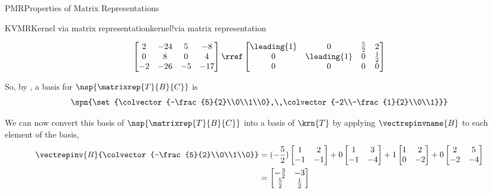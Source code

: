 \begin{subsect}{PMR}{Properties of Matrix Representations}
\begin{example}{KVMR}{Kernel via matrix representation}{kernel!via matrix representation}
\begin{para}
%
\begin{equation*}
\begin{bmatrix}
2 & -24 & 5 & -8 \\
0 & 8 & 0 & 4 \\
-2 & -26 & -5 & -17
\end{bmatrix}
\rref
\begin{bmatrix}
 \leading{1} & 0 & \frac{5}{2} & 2 \\
 0 & \leading{1} & 0 & \frac{1}{2} \\
 0 & 0 & 0 & 0
\end{bmatrix}
\end{equation*}
\end{para}
%
\begin{para}So, by , a basis for $\nsp{\matrixrep{T}{B}{C}}$ is
%
\begin{equation*}
\spn{\set{\colvector{-\frac{5}{2}\\0\\1\\0},\,\colvector{-2\\-\frac{1}{2}\\0\\1}}}
\end{equation*}
\end{para}
%
\begin{para}We can  now convert this basis of $\nsp{\matrixrep{T}{B}{C}}$ into a basis of $\krn{T}$ by applying $\vectrepinvname{B}$ to each element of the basis,
%
\begin{align*}
\vectrepinv{B}{\colvector{-\frac{5}{2}\\0\\1\\0}}&=
(-\frac{5}{2})\begin{bmatrix}1 & 2 \\ -1 & -1\end{bmatrix}+
0\begin{bmatrix}1 & 3 \\ -1 & -4\end{bmatrix}+
1\begin{bmatrix}1 & 2 \\ 0 & -2\end{bmatrix}+
0\begin{bmatrix}2 & 5 \\ -2 & -4\end{bmatrix}\\
&=\begin{bmatrix}-\frac{3}{2} & -3 \\ \frac{5}{2} & \frac{1}{2}\end{bmatrix}\\

\end{align*}
\end{para}
\end{example}
\end{subsect}

